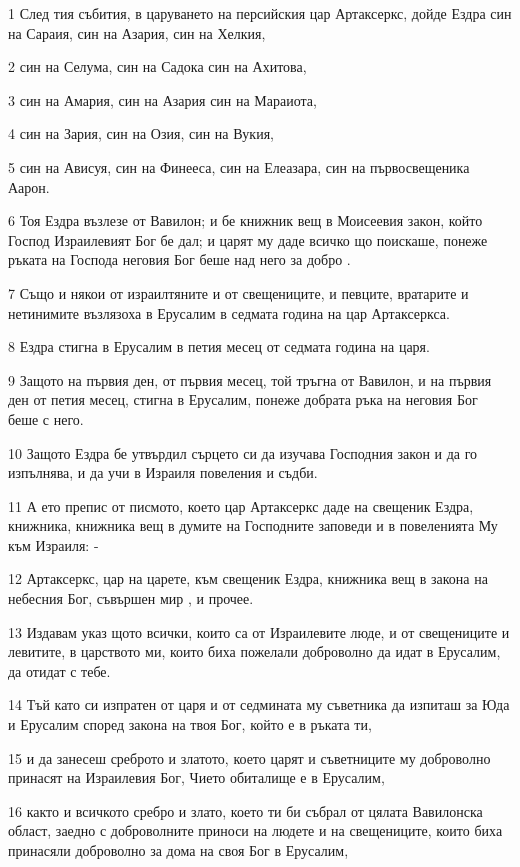 \par 1 След тия събития, в царуването на персийския цар Артаксеркс, дойде Ездра син на Сараия, син на Азария, син на Хелкия,
\par 2 син на Селума, син на Садока син на Ахитова,
\par 3 син на Амария, син на Азария син на Мараиота,
\par 4 син на Зария, син на Озия, син на Вукия,
\par 5 син на Ависуя, син на Финееса, син на Елеазара, син на първосвещеника Аарон.
\par 6 Тоя Ездра възлезе от Вавилон; и бе книжник вещ в Моисеевия закон, който Господ Израилевият Бог бе дал; и царят му даде всичко що поискаше, понеже ръката на Господа неговия Бог беше над него за добро .
\par 7 Също и някои от израилтяните и от свещениците, и певците, вратарите и нетинимите възлязоха в Ерусалим в седмата година на цар Артаксеркса.
\par 8 Ездра стигна в Ерусалим в петия месец от седмата година на царя.
\par 9 Защото на първия ден, от първия месец, той тръгна от Вавилон, и на първия ден от петия месец, стигна в Ерусалим, понеже добрата ръка на неговия Бог беше с него.
\par 10 Защото Ездра бе утвърдил сърцето си да изучава Господния закон и да го изпълнява, и да учи в Израиля повеления и съдби.
\par 11 А ето препис от писмото, което цар Артаксеркс даде на свещеник Ездра, книжника, книжника вещ в думите на Господните заповеди и в повеленията Му към Израиля: -
\par 12 Артаксеркс, цар на царете, към свещеник Ездра, книжника вещ в закона на небесния Бог, съвършен мир , и прочее.
\par 13 Издавам указ щото всички, които са от Израилевите люде, и от свещениците и левитите, в царството ми, които биха пожелали доброволно да идат в Ерусалим, да отидат с тебе.
\par 14 Тъй като си изпратен от царя и от седмината му съветника да изпиташ за Юда и Ерусалим според закона на твоя Бог, който е в ръката ти,
\par 15 и да занесеш среброто и златото, което царят и съветниците му доброволно принасят на Израилевия Бог, Чието обиталище е в Ерусалим,
\par 16 както и всичкото сребро и злато, което ти би събрал от цялата Вавилонска област, заедно с доброволните приноси на людете и на свещениците, които биха принасяли доброволно за дома на своя Бог в Ерусалим,
